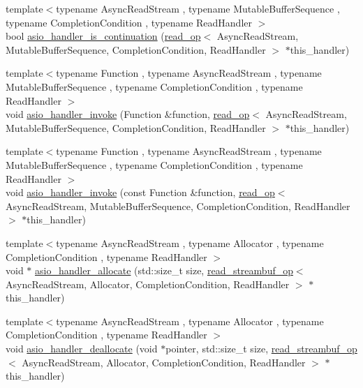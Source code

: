 \begin{DoxyCompactItemize}
\item 
{\footnotesize template$<$typename Async\+Read\+Stream , typename Mutable\+Buffer\+Sequence , typename Completion\+Condition , typename Read\+Handler $>$ }\\bool \hyperlink{namespaceasio_1_1detail_a7192b4eb539939717ebff6764c40e82b}{asio\+\_\+handler\+\_\+is\+\_\+continuation} (\hyperlink{classasio_1_1detail_1_1read__op}{read\+\_\+op}$<$ Async\+Read\+Stream, Mutable\+Buffer\+Sequence, Completion\+Condition, Read\+Handler $>$ $\ast$this\+\_\+handler)
\item 
{\footnotesize template$<$typename Function , typename Async\+Read\+Stream , typename Mutable\+Buffer\+Sequence , typename Completion\+Condition , typename Read\+Handler $>$ }\\void \hyperlink{namespaceasio_1_1detail_a86f36bbf9578d56ef1b697e483d7f575}{asio\+\_\+handler\+\_\+invoke} (Function \&function, \hyperlink{classasio_1_1detail_1_1read__op}{read\+\_\+op}$<$ Async\+Read\+Stream, Mutable\+Buffer\+Sequence, Completion\+Condition, Read\+Handler $>$ $\ast$this\+\_\+handler)
\item 
{\footnotesize template$<$typename Function , typename Async\+Read\+Stream , typename Mutable\+Buffer\+Sequence , typename Completion\+Condition , typename Read\+Handler $>$ }\\void \hyperlink{namespaceasio_1_1detail_a20b483f28ffc08d9a71556547c294a5c}{asio\+\_\+handler\+\_\+invoke} (const Function \&function, \hyperlink{classasio_1_1detail_1_1read__op}{read\+\_\+op}$<$ Async\+Read\+Stream, Mutable\+Buffer\+Sequence, Completion\+Condition, Read\+Handler $>$ $\ast$this\+\_\+handler)
\item 
{\footnotesize template$<$typename Async\+Read\+Stream , typename Allocator , typename Completion\+Condition , typename Read\+Handler $>$ }\\void $\ast$ \hyperlink{namespaceasio_1_1detail_ac90f5d06cae7cb5491353ea33f2e09f2}{asio\+\_\+handler\+\_\+allocate} (std\+::size\+\_\+t size, \hyperlink{classasio_1_1detail_1_1read__streambuf__op}{read\+\_\+streambuf\+\_\+op}$<$ Async\+Read\+Stream, Allocator, Completion\+Condition, Read\+Handler $>$ $\ast$this\+\_\+handler)
\item 
{\footnotesize template$<$typename Async\+Read\+Stream , typename Allocator , typename Completion\+Condition , typename Read\+Handler $>$ }\\void \hyperlink{namespaceasio_1_1detail_a5b30ffdbf326699e552d0d6bddfdcd83}{asio\+\_\+handler\+\_\+deallocate} (void $\ast$pointer, std\+::size\+\_\+t size, \hyperlink{classasio_1_1detail_1_1read__streambuf__op}{read\+\_\+streambuf\+\_\+op}$<$ Async\+Read\+Stream, Allocator, Completion\+Condition, Read\+Handler $>$ $\ast$this\+\_\+handler)

\end{DoxyCompactItemize}
